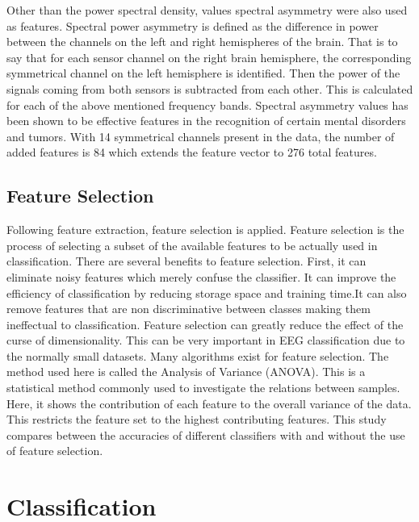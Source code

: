 \documentclass[12pt, a4paper, fleqn]{memoir}%
\begin{document}
\newpage
Other than the power spectral density, values spectral asymmetry were also used as features. Spectral power asymmetry is defined as the difference in power between the channels on the left and right hemispheres of the brain. That is to say that for each sensor channel on the right brain hemisphere, the corresponding symmetrical channel on the left hemisphere is identified. Then the power of the signals coming from both sensors is subtracted from each other. This is calculated for each of the above mentioned frequency bands. Spectral asymmetry values has been shown to be effective features in the recognition of certain mental disorders and tumors. With 14 symmetrical channels present in the data, the number of added features is 84 which extends the feature vector to 276 total features.

\section{Feature Selection}
\label{sec:FeatureSelection}
Following feature extraction, feature selection is applied. Feature selection is the process of selecting a subset of the available features to be actually used in classification. There are several benefits to feature selection. First, it can eliminate noisy features which merely confuse the classifier. It can improve the efficiency of classification by reducing storage space and training time.It can also remove features that are non discriminative between classes making them ineffectual to classification. Feature selection can greatly reduce the effect of the curse of dimensionality. This can be very important in EEG classification due to the normally small datasets. Many algorithms exist for feature selection. The method used here is called the Analysis of Variance (ANOVA). This is a statistical method commonly used to investigate the relations between samples. Here, it shows the contribution of each feature to the overall variance of the data. This restricts the feature set to the highest contributing features. This study compares between the accuracies of different classifiers with and without the use of feature selection\cite{guyon2003introduction}.

\chapter{Classification}
\label{chap:Classification}
\end{document}
